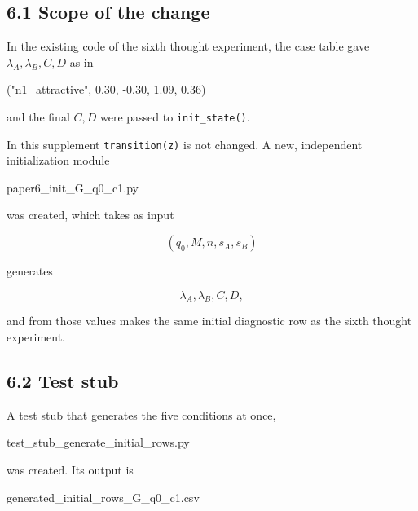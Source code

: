 \documentclass[
  a4paper,
]{article}
\newenvironment{Shaded}{}{}
\newcommand{\FloatTok}[1]{\textcolor[rgb]{0.25,0.63,0.44}{#1}}
\newcommand{\NormalTok}[1]{#1}
\newcommand{\OperatorTok}[1]{\textcolor[rgb]{0.40,0.40,0.40}{#1}}
\newcommand{\StringTok}[1]{\textcolor[rgb]{0.25,0.44,0.63}{#1}}
\begin{document}
\subsection{6.1 Scope of the change}\label{scope-of-the-change}

In the existing code of the sixth thought experiment, the case table
gave \(\lambda_A,\lambda_B,C,D\) as in

\begin{Shaded}
\begin{Highlighting}[]
\NormalTok{(}\StringTok{"n1\_attractive"}\NormalTok{, }\FloatTok{0.30}\NormalTok{, }\OperatorTok{{-}}\FloatTok{0.30}\NormalTok{, }\FloatTok{1.09}\NormalTok{, }\FloatTok{0.36}\NormalTok{)}
\end{Highlighting}
\end{Shaded}

and the final \(C,D\) were passed to \texttt{init\_state()}.

In this supplement \texttt{transition(z)} is not changed. A new,
independent initialization module

\begin{Shaded}
\begin{Highlighting}[]
\NormalTok{paper6\_init\_G\_q0\_c1.py}
\end{Highlighting}
\end{Shaded}

was created, which takes as input

\[
(q_0,M,n,s_A,s_B)
\]

generates

\[
\lambda_A,\lambda_B,C,D,
\]

and from those values makes the same initial diagnostic row as the sixth
thought experiment.

\subsection{6.2 Test stub}\label{test-stub}

A test stub that generates the five conditions at once,

\begin{Shaded}
\begin{Highlighting}[]
\NormalTok{test\_stub\_generate\_initial\_rows.py}
\end{Highlighting}
\end{Shaded}

was created. Its output is

\begin{Shaded}
\begin{Highlighting}[]
\NormalTok{generated\_initial\_rows\_G\_q0\_c1.csv}
\end{Highlighting}
\end{Shaded}
\end{document}

